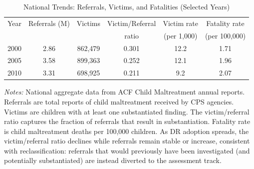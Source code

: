 \begin{table}[htbp]
\centering
\begin{threeparttable}
\caption{National Trends: Referrals, Victims, and Fatalities (Selected Years)}
\label{tab:decomposition}
\small
\begin{tabular}{lccccc}
\toprule
Year & Referrals (M) & Victims & Victim/Referral & Victim rate & Fatality rate \\
 & & & ratio & (per 1,000) & (per 100,000) \\
\midrule
2000 & 2.86 & 862,479 & 0.301 & 12.2 & 1.71 \\
2005 & 3.58 & 899,363 & 0.252 & 12.1 & 1.96 \\
2010 & 3.31 & 698,925 & 0.211 & 9.2 & 2.07 \\
\bottomrule
\end{tabular}
\begin{tablenotes}
\item \textit{Notes:} National aggregate data from ACF Child Maltreatment annual reports. Referrals are total reports of child maltreatment received by CPS agencies. Victims are children with at least one substantiated finding. The victim/referral ratio captures the fraction of referrals that result in substantiation. Fatality rate is child maltreatment deaths per 100,000 children. As DR adoption spreads, the victim/referral ratio declines while referrals remain stable or increase, consistent with reclassification: referrals that would previously have been investigated (and potentially substantiated) are instead diverted to the assessment track.
\end{tablenotes}
\end{threeparttable}
\end{table}
